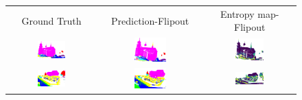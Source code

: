     \begin{figure}[h!]
        \centering
        \begin{tabular}{ccc}
            Ground Truth & Prediction-Flipout & Entropy map-Flipout \\
            \includegraphics[width=0.33\textwidth, height=0.18\textheight]{images/seg_output/sem3d_seg_output/1_GT.pdf} &
            \includegraphics[width=0.33\textwidth, height=0.18\textheight]{images/seg_output/flipout/sem3d_1.pdf}& 
            \includegraphics[width=0.33\textwidth, height=0.18\textheight]{images/seg_output/sem3d_seg_output/ent_fout_1.pdf}\\

            \includegraphics[width=0.33\textwidth, height=0.18\textheight]{images/seg_output/sem3d_seg_output/2_GT.pdf} &
            \includegraphics[width=0.33\textwidth, height=0.18\textheight]{images/seg_output/flipout/sem3d_2.pdf}& 
            \includegraphics[width=0.33\textwidth, height=0.18\textheight]{images/seg_output/sem3d_seg_output/ent_fout_2.pdf}\\


\end{tabular}
\end{figure}
